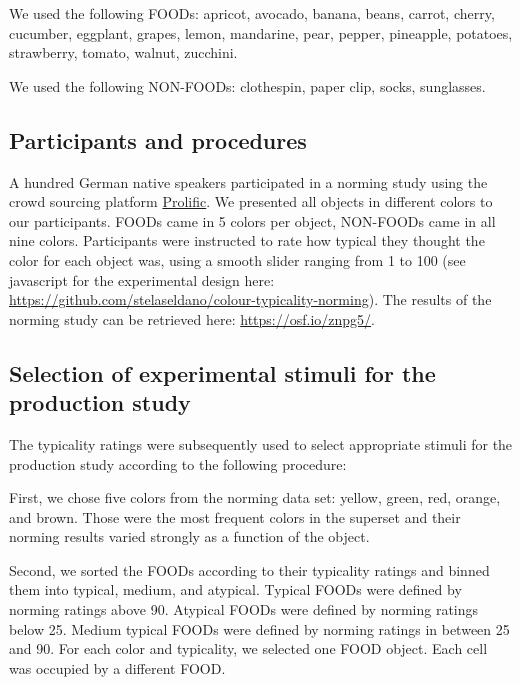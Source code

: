\documentclass[
]{article}
\begin{document}
We used the following FOODs: apricot, avocado, banana, beans, carrot, cherry, cucumber, eggplant, grapes, lemon, mandarine, pear, pepper, pineapple, potatoes, strawberry, tomato, walnut, zucchini.

We used the following NON-FOODs: clothespin, paper clip, socks, sunglasses.

\hypertarget{participants-and-procedures}{%
\subsection{Participants and procedures}\label{participants-and-procedures}}

A hundred German native speakers participated in a norming study using the crowd sourcing platform \href{https://www.prolific.ac}{Prolific}.
We presented all objects in different colors to our participants.
FOODs came in 5 colors per object, NON-FOODs came in all nine colors.
Participants were instructed to rate how typical they thought the color for each object was, using a smooth slider ranging from 1 to 100 (see javascript for the experimental design here: \url{https://github.com/stelaseldano/colour-typicality-norming}).
The results of the norming study can be retrieved here: \url{https://osf.io/znpg5/}.

\hypertarget{selection-of-experimental-stimuli-for-the-production-study}{%
\subsection{Selection of experimental stimuli for the production study}\label{selection-of-experimental-stimuli-for-the-production-study}}

The typicality ratings were subsequently used to select appropriate stimuli for the production study according to the following procedure:

First, we chose five colors from the norming data set: yellow, green, red, orange, and brown.
Those were the most frequent colors in the superset and their norming results varied strongly as a function of the object.

Second, we sorted the FOODs according to their typicality ratings and binned them into typical, medium, and atypical.
Typical FOODs were defined by norming ratings above 90.
Atypical FOODs were defined by norming ratings below 25.
Medium typical FOODs were defined by norming ratings in between 25 and 90.
For each color and typicality, we selected one FOOD object.
Each cell was occupied by a different FOOD.
\end{document}
